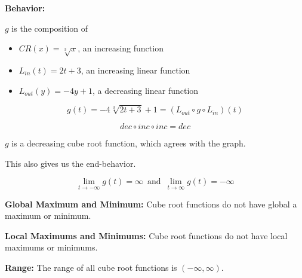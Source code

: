 \documentclass{ximera}
\begin{document}
\begin{example}
\textbf{Behavior:} 


$g$ is the composition of

\begin{itemize}
\item $CR(x) = \sqrt[3]{x}$, an increasing function
\item $L_{in}(t) = 2t+3$, an increasing linear function
\item $L_{out}(y) = -4y + 1$, a decreasing linear function
\end{itemize}


\[ g(t) = -4 \sqrt[3]{2t+3}+1 =  (L_{out} \circ g \circ L_{in})(t) \]

\[ dec \circ inc \circ inc = dec  \]


$g$ is a decreasing cube root function, which agrees with the graph.

This also gives us the end-behavior.


\[ \lim\limits_{t \to -\infty} g(t) = \infty \, \text{ and } \,  \lim\limits_{t \to \infty} g(t) = -\infty \]



\textbf{Global Maximum and Minimum:}  Cube root functions do not have global a maximum or minimum. 


\textbf{Local Maximums and Minimums:}  Cube root functions do not have local maximums or minimums. 


\textbf{Range:} The range of all cube root functions is $(-\infty, \infty)$. 




\end{example}
\end{document}
